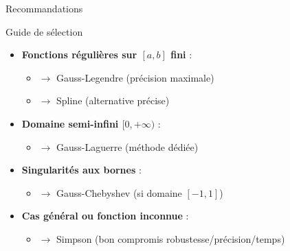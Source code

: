 \documentclass[aspectratio=169,11pt]{beamer}
\begin{document}
\begin{frame}{Recommandations}
\vspace{-0.2cm}
\begin{block}{Guide de sélection}
\small
\begin{itemize}
\item \textbf{Fonctions régulières sur $[a,b]$ fini} :
\begin{itemize}
\item $\rightarrow$ Gauss-Legendre (précision maximale)
\item $\rightarrow$ Spline (alternative précise)
\end{itemize}
\item \textbf{Domaine semi-infini $[0,+\infty)$} :
\begin{itemize}
\item $\rightarrow$ Gauss-Laguerre (méthode dédiée)
\end{itemize}
\item \textbf{Singularités aux bornes} :
\begin{itemize}
\item $\rightarrow$ Gauss-Chebyshev (si domaine $[-1,1]$)
\end{itemize}
\item \textbf{Cas général ou fonction inconnue} :
\begin{itemize}
\item $\rightarrow$ Simpson (bon compromis robustesse/précision/temps)
\end{itemize}
\end{itemize}
\end{block}
\end{frame}
\end{document}
